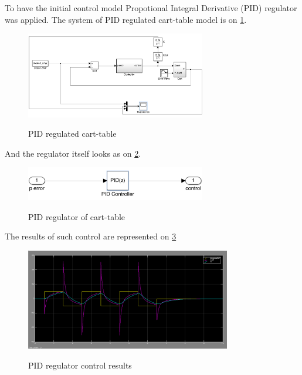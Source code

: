 \documentclass[12pt,a4paper]{report}
\begin{document}
		To have the initial control model Propotional Integral Derivative (PID) regulator was applied. The system of PID regulated cart-table model is on \cref{fig:15}.
		
		\begin{figure}[h!]
			\vspace{-0.2cm}
			\centering
			{\includegraphics[width=0.7\textwidth]{15}}
			\caption{PID regulated cart-table}
			\label{fig:15}
			\vspace{-0.1cm}
		\end{figure}
		
		And the regulator itself looks as on \cref{fig:16}.
		
		\begin{figure}[h!]
			\vspace{-0.2cm}
			\centering
			{\includegraphics[width=0.7\textwidth]{16}}
			\caption{PID regulator of cart-table}
			\label{fig:16}
			\vspace{-0.1cm}
		\end{figure}
		
		The results of such control are represented on \cref{fig:17}
		
		\begin{figure}[h!]
			\vspace{-0.2cm}
			\centering
			{\includegraphics[width=0.8\textwidth]{17}}
			\caption{PID regulator control results}
			\label{fig:17}
			\vspace{-0.1cm}
		\end{figure}
		
\end{document}
